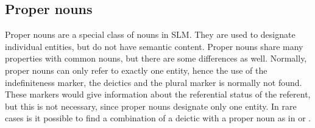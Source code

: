 %
%



%





\subsection{Proper nouns}\label{sec:wc:Propernouns}
Proper nouns are a special class of nouns in SLM. They are used to designate individual entities, but do not have semantic content.
Proper nouns share many properties with common nouns, but there are some differences as well. Normally, proper nouns can only refer to exactly one entity, hence the use of the indefiniteness marker, the deictics and the plural marker is normally not found. These markers would give information about the referential status of the referent, but this is not necessary, since proper nouns designate only one entity. In rare cases is it possible to find a combination of a deictic with a proper noun as in  or .

 \\

